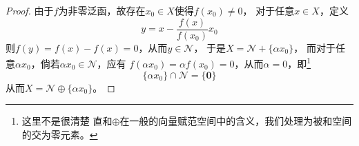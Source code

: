 \documentclass[cn]{homework}
\begin{document}
    \problem
    \begin{proof}
        由于$f$为非零泛函，故存在$x_0\in X$使得$f(x_0)\neq 0$，
        对于任意$x\in X$，定义
        \[y=x-\frac{f(x)}{f(x_0)}x_0\]
        则$f(y)=f(x)-f(x)=0$，从而$y\in\mathscr N$，
        于是$X=\mathscr N+\{\alpha x_0\}$，
        而对于任意$\alpha x_0$，倘若$\alpha x_0\in\mathscr N$，应有
        $f(\alpha x_0)=\alpha f(x_0)=0$，从而$\alpha=0$，即\footnote{这里不是很清楚
        直和$\oplus$在一般的向量赋范空间中的含义，我们处理为被和空间的交为零元素。}
        \[\{\alpha x_0\}\cap\mathscr N=\{\boldsymbol 0\}\]
        从而$X=\mathscr N\oplus\{\alpha x_0\}$。
    \end{proof}
\end{document}

